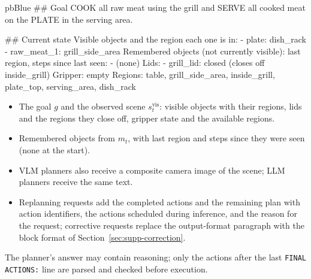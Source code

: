 \begin{tcbraster}[raster columns=2, raster equal height=rows, raster column skip=3mm, raster before skip=2mm, raster after skip=2mm]
\begin{promptbox}[unbreakable, listing options={style=promptstyle, basicstyle=\ttfamily\footnotesize}]{pbBlue}{}
## Goal
COOK all raw meat using the grill and SERVE all cooked meat on the PLATE in the serving area.

## Current state
Visible objects and the region each one is in:
- plate: dish_rack
- raw_meat_1: grill_side_area
Remembered objects (not currently visible): last region, steps since last seen:
- (none)
Lids:
- grill_lid: closed (closes off inside_grill)
Gripper: empty
Regions: table, grill_side_area, inside_grill, plate_top, serving_area, dish_rack
\end{promptbox}
\begin{tcolorbox}[notebox, title={Information supplied with each request}]
\begin{itemize}\setlength{\itemsep}{1pt}
\item The goal $g$ and the observed scene $s_t^{\mathrm{vis}}$: visible objects with their regions, lids and the
regions they close off, gripper state and the available regions.
\item Remembered objects from $m_t$, with last region and steps since they were seen (none at the start).
\item VLM planners also receive a composite camera image of the scene; LLM planners receive the same text.
\item Replanning requests add the completed actions and the remaining plan with action identifiers, the
actions scheduled during inference, and the reason for the request; corrective requests replace the
output-format paragraph with the block format of Section~\ref{sec:supp-correction}.
\end{itemize}
\end{tcolorbox}
\end{tcbraster}

\noindent The planner's answer may contain reasoning; only the actions after the last \texttt{FINAL ACTIONS:}
line are parsed and checked before execution.

\newpage
